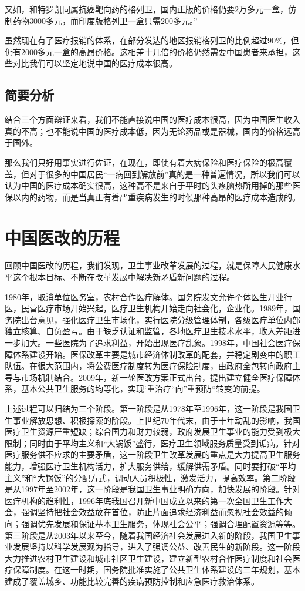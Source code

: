 \documentclass[11pt,twoside,a4paper]{article}
\begin{document}
		又如，和特罗凯同属抗癌靶向药的格列卫，国内正版的价格仍要$2$万多元一盒，仿制药物$3000$多元，而印度版格列卫一盒只需$200$多元。”
		
		虽然现在有了医疗报销的体系，在部分发达的地区报销格列卫的比例超过$90\%$，但仍有$2000$多元一盒的高昂价格。这相差十几倍的价格仍然需要中国患者来承担，这些对比我们可以坚定地说中国的医疗成本很高。
		
		\subsection{简要分析}
		结合三个方面辩证来看，我们不能直接说中国的医疗成本很高，因为中国医生收入真的不高；也不能说中国的医疗成本低，因为无论药品或是器械，国内的价格远高于国外。
		
		那么我们只好用事实进行佐证，在现在，即使有着大病保险和医疗保险的极高覆盖，但对于很多的中国居民“一病回到解放前”真的是一种普遍情况，所以我们可以认为中国的医疗成本确实很高，这种高不是来自于平时的头疼脑热所用掉的那些医保以内的药物，而是当真正有着严重疾病发生的时候那种高昂的医疗成本造成的。
		
		\section{中国医改的历程}
		回顾中国医改的历程，我们发现，卫生事业改革发展的过程，就是保障人民健康水平这个根本目标、不断在改革发展中解决新矛盾新问题的过程。
		
		1980年，取消单位医务室，农村合作医疗解体。国务院发文允许个体医生开业行医，民营医疗市场开始兴起，医疗卫生机构开始走向社会化，企业化。1989年，国务院出台意见，强化医疗卫生市场化，实行医院分级管理体制，各级医疗单位内部独立核算、自负盈亏。由于缺乏认证和监管，各地医疗卫生技术水平，收入差距进一步加大。一些医院为了追求利益，开始出现医疗乱象。1998年，中国社会医疗保障体系建设开始。医保改革主要是城市经济体制改革的配套，并稳定剧变中的职工队伍。在很大范围内，将公费医疗制度转为医疗保险制度，由政府全包转向政府主导与市场机制结合。2009年，新一轮医改方案正式出台，提出建立健全医疗保障体系，基本公共卫生服务的均等化，实现‘重治疗“向”重预防“转变的前提。
		
		上述过程可以归结为三个阶段。第一阶段是从1978年至1996年，这一阶段是我国卫生事业解放思想、积极探索的阶段。上世纪70年代末，由于十年动乱的影响，我国医疗卫生资源严重短缺；综合国力和财力较弱，政府发展卫生事业的能力受到极大限制；同时由于平均主义和“大锅饭”盛行，医疗卫生领域服务质量受到诟病。针对医疗服务供不应求的主要矛盾，这一阶段卫生改革发展的重点是大力提高卫生服务能力，增强医疗卫生机构活力，扩大服务供给，缓解供需矛盾。同时要打破“平均主义”和“大锅饭”的分配方式，调动人员积极性，激发活力，提高效率。第二阶段是从1997年至2002年，这一阶段是我国卫生事业明确方向，加快发展的阶段。针对医疗机构的趋利性，1996年底我国召开新中国成立以来的第一次全国卫生工作大会，强调坚持把社会效益放在首位，防止片面追求经济利益而忽视社会效益的倾向；强调优先发展和保证基本卫生服务，体现社会公平；强调合理配置资源等等。第三阶段是从2003年以来至今，随着我国经济社会发展进入新的阶段，我国卫生事业发展坚持以科学发展观为指导，进入了强调公益、改善民生的新阶段。这一阶段大力推进农村卫生建设和城市社区卫生建设，建立新型农村合作医疗制度和社会医疗保障制度。在这一时期，国务院批准实施了公共卫生体系建设的三年规划，基本建成了覆盖城乡、功能比较完善的疾病预防控制和应急医疗救治体系。
		
\end{document}
